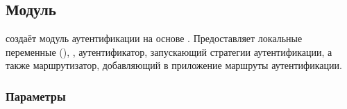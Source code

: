 \subsection{Модуль }\label{page-FPauth-core-module-FPauth+u+core-module-Make+u+Auth}%
 создаёт модуль аутентификации на основе \hyperref[page-FPauth-core-module-FPauth+u+core-module-Auth+u+sign-module-type-MODEL]{}. Предоставляет локальные переменные (), , аутентификатор, запускающий стратегии аутентификации, а также маршрутизатор, добавляющий в приложение маршруты аутентификации.

\subsubsection{Параметры\label{parameters}}%
